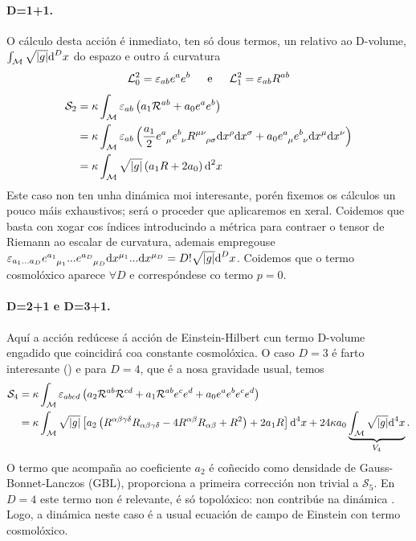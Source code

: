 \paragraph{D=1+1.} O cálculo desta acción é inmediato, ten só dous termos, un relativo ao D-volume,$\int_\mathcal{M}\sqrt{|g|}\text{d}^Dx$ do espazo e outro á curvatura
\begin{gather}
    \mathcal{L}_0^2 = \varepsilon_{ab}e^ae^b\hspace{1.5em}\text{e}\hspace{1.5em}\mathcal{L}_1^2 = \varepsilon_{ab}R^{ab}
\end{gather}\vspace{-2.5em}
\begin{align}
    \mathcal{S}_2 &= \kappa\int_\mathcal{M}\varepsilon_{ab}\left(
    a_1\mathcal{R}^{ab}+a_0e^ae^b
    \right)\\
    &= \kappa\int_\mathcal{M}\varepsilon_{ab}\left(
    \frac{a_1}2 \viel\biel R\indices{^\mu^\nu_{\rho\sigma}}\dd x^\rho\dd x^\sigma + a_0\viel\biel\dd x^\mu\dd x^\nu
    \right)\\
    &=\kappa\int_\mathcal{M}\sqrt{\abs g}\left(
    a_1R+2a_0
    \right)\dd^2x
\end{align}
Este caso non ten unha dinámica moi interesante, porén fixemos os cálculos un pouco máis exhaustivos; será o proceder que aplicaremos en xeral. Coidemos que basta con xogar cos índices introducindo a métrica para contraer o tensor de Riemann ao escalar de curvatura, ademais empregouse $\varepsilon_{a_1...a_D}e\indices{^{a_1}_{\mu_1}}...e\indices{^{a_D}_{\mu_D}}\dd x^{\mu_1}...\dd x^{\mu_D} = D!\sqrt{\abs g}\dd^Dx$. Coidemos que o termo cosmolóxico aparece $\forall D$ e correspóndese co termo $p=0$.
\vspace{-0.5em}
\paragraph{D=2+1 e D=3+1.} Aquí a acción redúcese á acción de Einstein-Hilbert cun termo D-volume engadido que coincidirá coa constante cosmolóxica. O caso $D=3$ é farto interesante (\cite{2+1grav0,2+1grav1}) e para $D=4$, que é a nosa gravidade usual, temos 
\begin{align}
    \mathcal{S}_4 &= \kappa\int_\mathcal{M}\varepsilon_{abcd}\left(
    a_2\mathcal{R}^{ab}\mathcal{R}^{cd} + a_1\mathcal{R}^{ab}e^ce^d + a_0e^ae^be^ce^d
    \right)\\ 
    &=\kappa\int_\mathcal{M}\sqrt{|g|}\left[
    a_2\left( R^{\alpha\beta\gamma\delta}R_{\alpha\beta\gamma\delta} - 4R^{\alpha\beta}R_{\alpha\beta} + R^2 \right) + 2a_1R
    \right]\text{d}^4x + 24\kappa a_0\underbrace{\int_\mathcal{M}\sqrt{|g|}\text{d}^4x}_{V_4}.
\end{align}
O termo que acompaña ao coeficiente $a_2$ é coñecido como densidade de Gauss-Bonnet-Lanczos (GBL), proporciona a primeira corrección non trivial a $\mathcal{S}_5$. En $D=4$ este termo non é relevante, é só topolóxico: non contribúe na dinámica \cite{Zanelli_2012}. Logo, a dinámica neste caso é a usual ecuación de campo de Einstein con termo cosmolóxico. 

